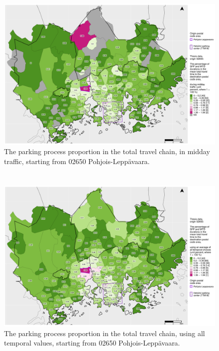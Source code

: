 \begin{figure}
    \section{}
    \centering
    \includegraphics[trim={0.9cm 0.3cm 0.25cm 0.3cm},clip,width=\textwidth]{images/compare_traveltimes_mapfill-msc_m_pct_fromzip-02650_11-10-2020.png}
    \caption[Parking process proportion from Pohjois-Leppävaara, midday traffic]{The parking process proportion in the total travel chain, in midday traffic, starting from 02650 Pohjois-Leppävaara.}%
    \label{fig:compare_msc_m_pct_02650}%
\end{figure}

\begin{figure}
    \section{}
    \centering
    \includegraphics[trim={0.9cm 0.3cm 0.25cm 0.3cm},clip,width=\textwidth]{images/compare_traveltimes_mapfill-msc_all_pct_fromzip-02650_11-10-2020.png}
    \caption[Parking process proportion from Pohjois-Leppävaara, all temporal values]{The parking process proportion in the total travel chain, using all temporal values, starting from 02650 Pohjois-Leppävaara.}%
    \label{fig:compare_msc_all_pct_02650}%
\end{figure}

